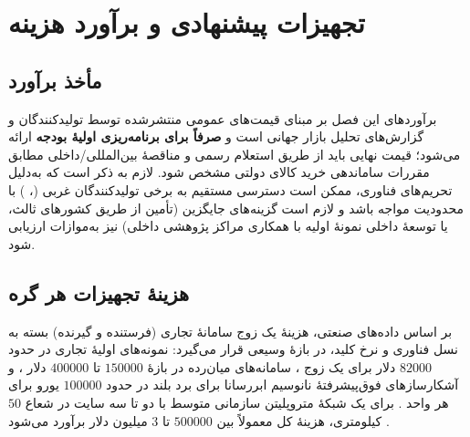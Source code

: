 \chapter{تجهیزات پیشنهادی و برآورد هزینه}
\label{chap:cost}

\section{مأخذ برآورد}

برآوردهای این فصل بر مبنای قیمت‌های عمومی منتشرشده توسط تولیدکنندگان و گزارش‌های تحلیل بازار جهانی است و \textbf{صرفاً برای برنامه‌ریزی اولیهٔ بودجه} ارائه می‌شود؛ قیمت نهایی باید از طریق استعلام رسمی و مناقصهٔ بین‌المللی/داخلی مطابق مقررات ساماندهی خرید کالای دولتی مشخص شود. لازم به ذکر است که به‌دلیل تحریم‌های فناوری، ممکن است دسترسی مستقیم به برخی تولیدکنندگان غربی (، ) با محدودیت مواجه باشد و لازم است گزینه‌های جایگزین (تأمین از طریق کشورهای ثالث، یا توسعهٔ داخلی نمونهٔ اولیه با همکاری مراکز پژوهشی داخلی) نیز به‌موازات ارزیابی شود.

\section{هزینهٔ تجهیزات هر گره}

بر اساس داده‌های صنعتی، هزینهٔ یک زوج سامانهٔ  تجاری (فرستنده و گیرنده) بسته به نسل فناوری و نرخ کلید، در بازهٔ وسیعی قرار می‌گیرد: نمونه‌های اولیهٔ تجاری در حدود $82000$ دلار برای یک زوج \Cite{mittech2009}، سامانه‌های میان‌رده در بازهٔ $150000$ تا $400000$ دلار \Cite{arxiv0905report}، و آشکارسازهای فوق‌پیشرفتهٔ نانوسیم ابررسانا برای برد بلند در حدود $100000$ یورو برای هر واحد \Cite{techtimes2026sweden}. برای یک شبکهٔ متروپلیتن سازمانی متوسط با دو تا سه سایت در شعاع $50$ کیلومتری، هزینهٔ کل معمولاً بین $500000$ تا $3$ میلیون دلار برآورد می‌شود \Cite{marketintelo2026}.

